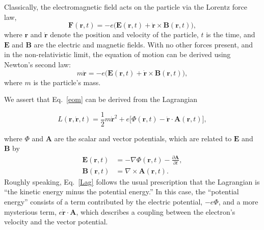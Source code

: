 \documentclass[prx,12pt]{revtex4-2}
\begin{document}
Classically, the electromagnetic field acts on the particle via the
Lorentz force law,
\begin{equation}
  \mathbf{F}(\mathbf{r},t) = -e\Big(\mathbf{E}(\mathbf{r},t)
  + \dot{\mathbf{r}}\times \mathbf{B}(\mathbf{r},t)\Big),
\end{equation}
where $\mathbf{r}$ and $\dot{\mathbf{r}}$ denote the position and
velocity of the particle, $t$ is the time, and $\mathbf{E}$ and
$\mathbf{B}$ are the electric and magnetic fields.  With no other
forces present, and in the non-relativistic limit, the equation of
motion can be derived using Newton's second law:
\begin{equation}
  m\ddot{\mathbf{r}} = -e\Big(\mathbf{E}(\mathbf{r},t)
  + \dot{\mathbf{r}} \times \mathbf{B}(\mathbf{r},t)\Big),
  \label{eom}
\end{equation}
where $m$ is the particle's mass.

We assert that Eq.~\eqref{eom} can be derived from the Lagrangian
\begin{framed}
\begin{equation}
  L(\mathbf{r},\dot{\mathbf{r}},t) = \frac{1}{2}m\dot{\mathbf{r}}^2
  + e \Big[\Phi(\mathbf{r},t) - \dot{\mathbf{r}} \cdot \mathbf{A}(\mathbf{r},t)
    \Big],
  \label{Lag}
\end{equation}
\end{framed}
\noindent
where $\Phi$ and $\mathbf{A}$ are the scalar and vector potentials,
which are related to $\mathbf{E}$ and $\mathbf{B}$ by
\begin{align}
  \mathbf{E}(\mathbf{r},t) &= - \nabla \Phi(\mathbf{r},t) - \frac{\partial\mathbf{A}}{\partial t}, \label{Efield0} \\
  \mathbf{B}(\mathbf{r},t) &= \nabla \times \mathbf{A}(\mathbf{r},t).
  \label{Bfield0}
\end{align}
Roughly speaking, Eq.~\eqref{Lag} follows the usual prescription that
the Lagrangian is ``the kinetic energy minus the potential energy.''
In this case, the ``potential energy'' consists of a term contributed
by the electric potential, $-e\Phi$, and a more mysterious term,
$e\dot{\mathbf{r}} \cdot \mathbf{A}$, which describes a coupling
between the electron's velocity and the vector potential.
\end{document}

